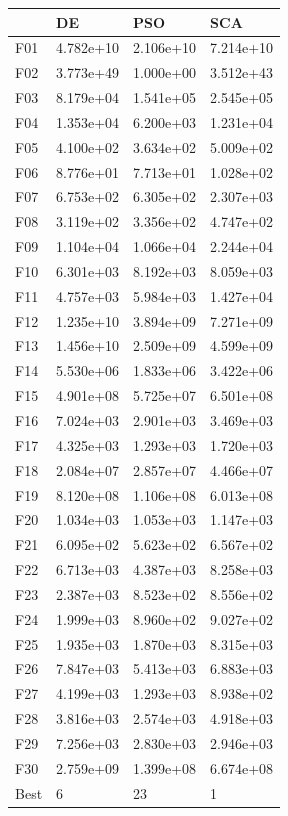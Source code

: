 \begin{tabular}{llll}
\toprule
{} &         DE &        PSO &        SCA \\
\midrule
F01  &  4.782e+10 &  2.106e+10 &  7.214e+10 \\
F02  &  3.773e+49 &  1.000e+00 &  3.512e+43 \\
F03  &  8.179e+04 &  1.541e+05 &  2.545e+05 \\
F04  &  1.353e+04 &  6.200e+03 &  1.231e+04 \\
F05  &  4.100e+02 &  3.634e+02 &  5.009e+02 \\
F06  &  8.776e+01 &  7.713e+01 &  1.028e+02 \\
F07  &  6.753e+02 &  6.305e+02 &  2.307e+03 \\
F08  &  3.119e+02 &  3.356e+02 &  4.747e+02 \\
F09  &  1.104e+04 &  1.066e+04 &  2.244e+04 \\
F10  &  6.301e+03 &  8.192e+03 &  8.059e+03 \\
F11  &  4.757e+03 &  5.984e+03 &  1.427e+04 \\
F12  &  1.235e+10 &  3.894e+09 &  7.271e+09 \\
F13  &  1.456e+10 &  2.509e+09 &  4.599e+09 \\
F14  &  5.530e+06 &  1.833e+06 &  3.422e+06 \\
F15  &  4.901e+08 &  5.725e+07 &  6.501e+08 \\
F16  &  7.024e+03 &  2.901e+03 &  3.469e+03 \\
F17  &  4.325e+03 &  1.293e+03 &  1.720e+03 \\
F18  &  2.084e+07 &  2.857e+07 &  4.466e+07 \\
F19  &  8.120e+08 &  1.106e+08 &  6.013e+08 \\
F20  &  1.034e+03 &  1.053e+03 &  1.147e+03 \\
F21  &  6.095e+02 &  5.623e+02 &  6.567e+02 \\
F22  &  6.713e+03 &  4.387e+03 &  8.258e+03 \\
F23  &  2.387e+03 &  8.523e+02 &  8.556e+02 \\
F24  &  1.999e+03 &  8.960e+02 &  9.027e+02 \\
F25  &  1.935e+03 &  1.870e+03 &  8.315e+03 \\
F26  &  7.847e+03 &  5.413e+03 &  6.883e+03 \\
F27  &  4.199e+03 &  1.293e+03 &  8.938e+02 \\
F28  &  3.816e+03 &  2.574e+03 &  4.918e+03 \\
F29  &  7.256e+03 &  2.830e+03 &  2.946e+03 \\
F30  &  2.759e+09 &  1.399e+08 &  6.674e+08 \\
Best &          6 &         23 &          1 \\
\bottomrule
\end{tabular}
